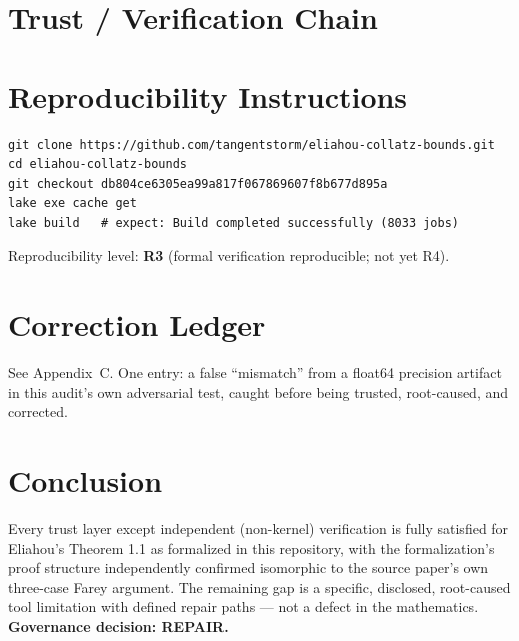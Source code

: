 \documentclass[11pt]{article}
\begin{document}
\section{Trust / Verification Chain}
\begin{center}
\end{center}

\section{Reproducibility Instructions}
\begin{verbatim}
git clone https://github.com/tangentstorm/eliahou-collatz-bounds.git
cd eliahou-collatz-bounds
git checkout db804ce6305ea99a817f067869607f8b677d895a
lake exe cache get
lake build   # expect: Build completed successfully (8033 jobs)
\end{verbatim}
Reproducibility level: \textbf{R3} (formal verification reproducible; not yet R4).

\section{Correction Ledger}
See Appendix~C. One entry: a false ``mismatch'' from a float64 precision artifact in this audit's own adversarial test, caught before being trusted, root-caused, and corrected.

\section{Conclusion}
Every trust layer except independent (non-kernel) verification is fully satisfied for Eliahou's Theorem 1.1 as formalized in this repository, with the formalization's proof structure independently confirmed isomorphic to the source paper's own three-case Farey argument. The remaining gap is a specific, disclosed, root-caused tool limitation with defined repair paths --- not a defect in the mathematics. \textbf{Governance decision: REPAIR.}
\end{document}
